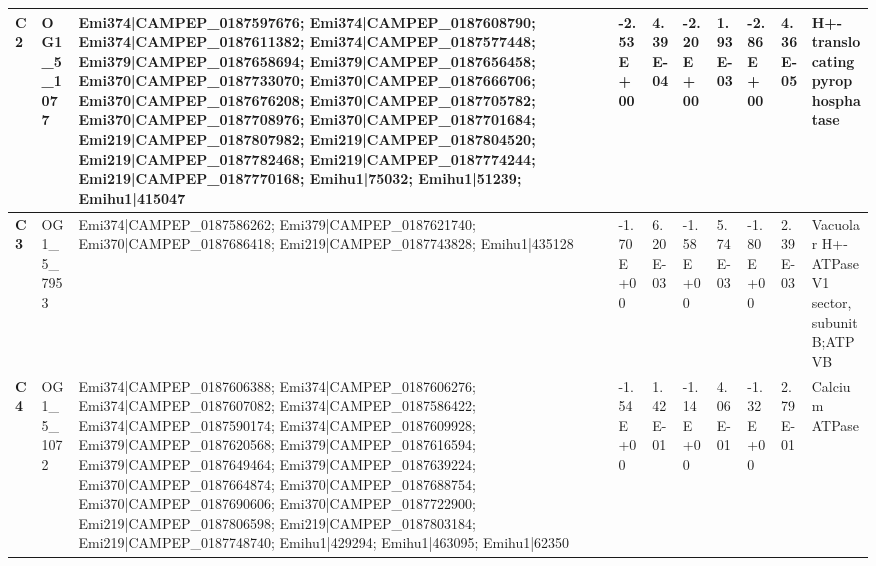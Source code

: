 \begin{landscape}
\begin{center}
\begin{footnotesize}
\begin{longtable}{|p{0.5cm}|p{1.5cm}|p{4cm}|l|l|l|l|l|l|l|}
\textbf{C2}  & OG1\_5\_1077  & Emi374|CAMPEP\_0187597676; Emi374|CAMPEP\_0187608790; Emi374|CAMPEP\_0187611382; Emi374|CAMPEP\_0187577448; Emi379|CAMPEP\_0187658694; Emi379|CAMPEP\_0187656458; Emi370|CAMPEP\_0187733070; Emi370|CAMPEP\_0187666706; Emi370|CAMPEP\_0187676208; Emi370|CAMPEP\_0187705782; Emi370|CAMPEP\_0187708976; Emi370|CAMPEP\_0187701684; Emi219|CAMPEP\_0187807982; Emi219|CAMPEP\_0187804520; Emi219|CAMPEP\_0187782468; Emi219|CAMPEP\_0187774244; Emi219|CAMPEP\_0187770168; Emihu1|75032; Emihu1|51239; Emihu1|415047                                                                                                                     & -2.53E+00 & 4.39E-04 & -2.20E+00 & 1.93E-03 & -2.86E+00 & 4.36E-05 & H+-translocating pyrophosphatase                                             \\ \hline
\textbf{C3}  & OG1\_5\_7953  & Emi374|CAMPEP\_0187586262; Emi379|CAMPEP\_0187621740; Emi370|CAMPEP\_0187686418; Emi219|CAMPEP\_0187743828; Emihu1|435128                                                                                                                                                                                                                                                                                                                                                                                                                                                                                                                & -1.70E+00 & 6.20E-03 & -1.58E+00 & 5.74E-03 & -1.80E+00 & 2.39E-03 & Vacuolar H+-ATPase V1 sector, subunit B;ATPVB                                \\ \hline
\textbf{C4}  & OG1\_5\_1072  & Emi374|CAMPEP\_0187606388; Emi374|CAMPEP\_0187606276; Emi374|CAMPEP\_0187607082; Emi374|CAMPEP\_0187586422; Emi374|CAMPEP\_0187590174; Emi374|CAMPEP\_0187609928; Emi379|CAMPEP\_0187620568; Emi379|CAMPEP\_0187616594; Emi379|CAMPEP\_0187649464; Emi379|CAMPEP\_0187639224; Emi370|CAMPEP\_0187664874; Emi370|CAMPEP\_0187688754; Emi370|CAMPEP\_0187690606; Emi370|CAMPEP\_0187722900; Emi219|CAMPEP\_0187806598; Emi219|CAMPEP\_0187803184; Emi219|CAMPEP\_0187748740; Emihu1|429294; Emihu1|463095; Emihu1|62350                                                                                                                    & -1.54E+00 & 1.42E-01 & -1.14E+00 & 4.06E-01 & -1.32E+00 & 2.79E-01 & Calcium ATPase                                                               \\ \hline

\end{longtable}
\end{footnotesize}
\end{center}
\end{landscape}

